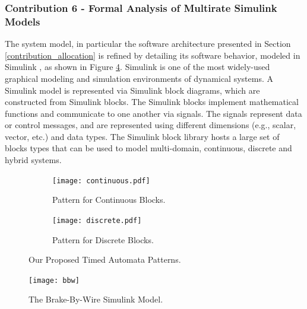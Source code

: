 \subsubsection{Contribution 6 - Formal Analysis of Multirate Simulink Models}
The system model, in particular the software architecture presented in Section \ref{contribution_allocation} is refined by detailing its software behavior, modeled in Simulink \cite{JamesB.Dabney2003MasteringSimulink}, as shown in Figure \ref{fig_bbw}. Simulink is one of the most widely-used graphical modeling and simulation environments of dynamical systems. A Simulink model is represented via Simulink block diagrams, which are constructed from Simulink blocks. The Simulink blocks implement mathematical functions and communicate to one another via signals. The signals represent data or control messages, and are represented using different dimensions (e.g., scalar, vector, etc.) and data types. The Simulink block library hosts a large set of blocks types that can be used to model multi-domain, continuous, discrete and hybrid systems.
\begin{figure}[h]
\centering
  	\begin{subfigure}[b]{0.5\textwidth}
  	\centering
  	\texttt{[image: continuous.pdf]}
    \caption{Pattern for Continuous Blocks.}
    \label{fig_continuous_block_ta}
	\end{subfigure}%
	\begin{subfigure}[b]{0.5\textwidth}
  	\centering
  	\texttt{[image: discrete.pdf]}
    \caption{Pattern for Discrete Blocks.}
    \label{fig_discrete_block_ta}
	\end{subfigure}%
  \caption{Our Proposed Timed Automata Patterns.}
  \label{fig_ta}
\end{figure}
\begin{figure}[h]
\centering
\texttt{[image: bbw]}\\
\caption{The Brake-By-Wire Simulink Model.}
\label{fig_bbw}
\end{figure}




